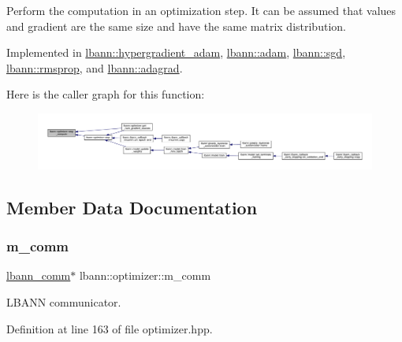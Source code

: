 Perform the computation in an optimization step. It can be assumed that values and gradient are the same size and have the same matrix distribution. 

Implemented in \hyperlink{classlbann_1_1hypergradient__adam_af9168cfd95707f361f0412ff2440761f}{lbann\+::hypergradient\+\_\+adam}, \hyperlink{classlbann_1_1adam_a3bcd1bcbbed2b99c407eb0cd9fd6d449}{lbann\+::adam}, \hyperlink{classlbann_1_1sgd_a083a44b456939b58f531cea1fde2378b}{lbann\+::sgd}, \hyperlink{classlbann_1_1rmsprop_a600e4b332299a6aaa36d0b7ff458e3f3}{lbann\+::rmsprop}, and \hyperlink{classlbann_1_1adagrad_a99dbaed2a331ce8d13a73e7beb7f5aba}{lbann\+::adagrad}.

Here is the caller graph for this function\+:\nopagebreak
\begin{figure}[H]
\begin{center}
\leavevmode
\includegraphics[width=350pt]{classlbann_1_1optimizer_a0db72c298a0bc3405fb0af97d104a036_icgraph}
\end{center}
\end{figure}


\subsection{Member Data Documentation}
\mbox{\label{classlbann_1_1optimizer_a8c2569a8fcf0ee969517067b81896c44}} 
\subsubsection{\texorpdfstring{m\+\_\+comm}{m\_comm}}
{\footnotesize\ttfamily \hyperlink{classlbann_1_1lbann__comm}{lbann\+\_\+comm}$\ast$ lbann\+::optimizer\+::m\+\_\+comm\hspace{0.3cm}{\ttfamily [protected]}}

L\+B\+A\+NN communicator. 

Definition at line 163 of file optimizer.\+hpp.

\mbox{\label{classlbann_1_1optimizer_a2f24dbeaca18b06f4aa7d179bbf96680}} 
